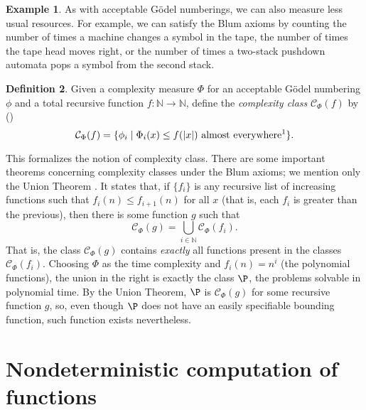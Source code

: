 \documentclass[12pt]{article}
\theoremstyle{definition}
\newtheorem{definition}{Definition}
\newtheorem{example}[definition]{Example}
\begin{document}
\begin{example}
    As with acceptable Gödel numberings,
    we can also measure less usual resources.
    For example, we can satisfy the Blum axioms by
    counting the number of times a machine changes a symbol in the tape,
    the number of times the tape head moves right,
    or the number of times a two-stack pushdown automata
    pops a symbol from the second stack.
\end{example}

\begin{definition}
    Given a complexity measure $\Phi$ for an acceptable Gödel numbering $\phi$
    and a total recursive function $f : \mathbb N \to \mathbb N$,
    define the \emph{complexity class} $\mathcal C_\Phi(f)$ by
    (\cite[p.~232]{Kozen2006})
    \begin{equation*}
        \mathcal C_\Phi(f) = \{
            \phi_i \mid \Phi_i(x) \leq f(|x|)\ \text{almost everywhere\footnotemark}
        \}.
    \end{equation*}
\end{definition}

This formalizes the notion of complexity class.
There are some important theorems concerning complexity classes
under the Blum axioms;
we mention only the Union Theorem \cite[p.~234]{Kozen2006}.
It states that,
if $\{f_i\}$ is any recursive list of increasing functions
such that $f_i(n) \leq f_{i+1}(n)$ for all $x$
(that is, each $f_i$ is greater than the previous),
then there is some function $g$ such that
\begin{equation*}
    \mathcal C_\Phi(g) = \bigcup_{i \in \mathbb N} \mathcal C_\Phi(f_i).
\end{equation*}
That is, the class $\mathcal C_\Phi(g)$ contains \emph{exactly}
all functions present in the classes $\mathcal C_\Phi(f_i)$.
Choosing $\Phi$ as the time complexity and $f_i(n) = n^i$
(the polynomial functions),
the union in the right is exactly the class $\P$,
the problems solvable in polynomial time.
By the Union Theorem, $\P$ is $\mathcal C_\Phi(g)$
for some recursive function $g$,
so, even though $\P$ does not have an easily specifiable bounding function,
such function exists nevertheless.

\section{Nondeterministic computation of functions}
\label{sec:nondeterministic_computation_of_functions}
\end{document}
